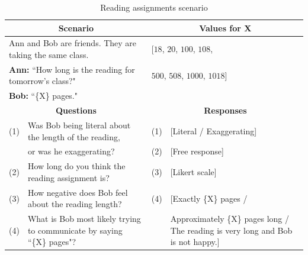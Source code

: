 \documentclass{article} %
\begin{document}
\begin{table}[h]
\begin{tabular}{| p{0.15cm}  p{8.15cm}| p{0.15cm}p{4cm} |}\hline
\multicolumn{2}{|c|}{\textbf{Scenario}} & \multicolumn{2}{c|}{\textbf{Values for X}} \\\hline
\multicolumn{2}{|l|}{Ann and Bob are friends. They are taking the same class.} & \multicolumn{2}{l|}{[$18$, $20$, $100$, $108$,}\\
\multicolumn{2}{|l|}{\textbf{Ann:} ``How long is the reading for tomorrow's class?"} & \multicolumn{2}{l|}{$500$, $508$, $1000$, $1018$]}\\
\multicolumn{2}{|l|}{\textbf{Bob:} ``\{X\} pages."} & \multicolumn{2}{l|}{}\\\hline
\multicolumn{2}{|c|}{\textbf{Questions}} & \multicolumn{2}{c|}{\textbf{Responses}} \\\hline
(1) & Was Bob being literal about the length of the reading, & (1) &[Literal / Exaggerating] \\
 & or was he exaggerating? & (2) & [Free response] \\
(2) & How long do you think the reading assignment is? & (3) & [Likert scale] \\
(3) & How negative does Bob feel about the reading length? & (4) & [Exactly \{X\} pages / \\
(4) & What is Bob most likely trying to communicate by saying  ``\{X\} pages"? & & Approximately \{X\} pages long / The reading is very long and Bob is not happy.]\\\hline
\end{tabular}
\caption{Reading assignments scenario}
\label{tab:readingtable}
\end{table}
\end{document}
